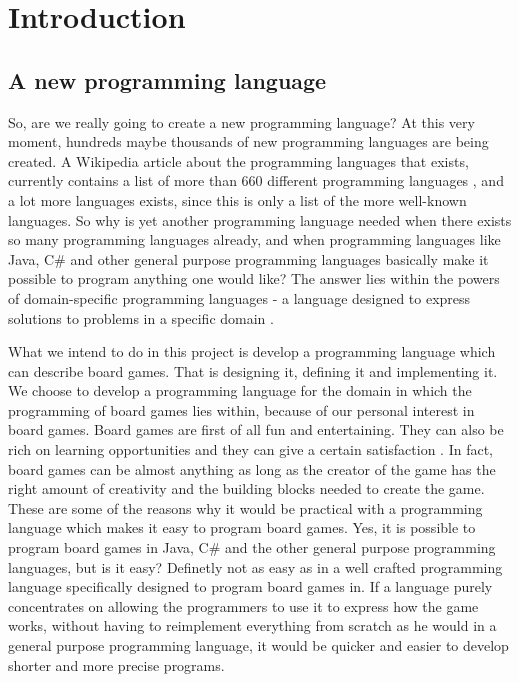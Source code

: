 \chapter{Introduction}
\label{chap:introduction}

\section{A new programming language}
So, are we really going to create a new programming language? At this very moment, hundreds maybe thousands of new programming languages are being created. A Wikipedia article about the programming languages that exists, currently contains a list of more than 660 different programming languages \cite{listofprogramminglanguages}, and a lot more languages exists, since this is only a list of the more well-known languages. So why is yet another programming language needed when there exists so many programming languages already, and when programming languages like Java, C\# and other general purpose programming languages basically make it possible to program anything one would like? The answer lies within the powers of domain-specific programming languages - a language designed to express solutions to problems in a specific domain \cite{domainspecificprogramminglanguagedefinition}. 

What we intend to do in this project is develop a programming language which can describe board games. That is designing it, defining it and implementing it. We choose to develop a programming language for the domain in which the programming of board games lies within, because of our personal interest in board games. Board games are first of all fun and entertaining. They can also be rich on learning opportunities \cite{whyboardgames1?} and they can give a certain satisfaction \cite{whyboardgames2?}. In fact, board games can be almost anything as long as the creator of the game has the right amount of creativity and the building blocks needed to create the game. These are some of the reasons why it would be practical with a programming language which makes it easy to program board games. Yes, it is possible to program board games in Java, C\# and the other general purpose programming languages, but is it easy? Definetly not as easy as in a well crafted programming language specifically designed to program board games in. If a language purely concentrates on allowing the programmers to use it to express how the game works, without having to reimplement everything from scratch as he would in a general purpose programming language, it would be quicker and easier to develop shorter and more precise programs.  

